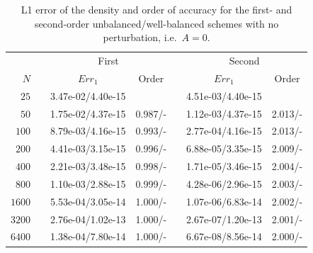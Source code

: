 \begin{table}\centering
\caption{L1 error of the density and order of accuracy for the first- and second-order unbalanced/well-balanced schemes with no perturbation, i.e.\ $A=0$.}
\label{table:OVS_A0}
\begin{tabular}{@{}rcccccc@{}}\toprule
& \phantom{a} & \multicolumn{2}{c}{First} & \phantom{ab} & \multicolumn{2}{c}{Second}\\
\cmidrule{3-4} \cmidrule{6-7}
$N$ && $Err_1$ & Order && $Err_1$ & Order\\ \midrule
$25$ && 3.47e-02/4.40e-15 &&& 4.51e-03/4.40e-15 &\\
$50$ && 1.75e-02/4.37e-15 & 0.987/- && 1.12e-03/4.37e-15 & 2.013/-\\
$100$ && 8.79e-03/4.16e-15 & 0.993/- && 2.77e-04/4.16e-15 & 2.013/-\\
$200$ && 4.41e-03/3.15e-15 & 0.996/- && 6.88e-05/3.35e-15 & 2.009/-\\
$400$ && 2.21e-03/3.48e-15 & 0.998/- && 1.71e-05/3.46e-15 & 2.004/-\\
$800$ && 1.10e-03/2.88e-15 & 0.999/- && 4.28e-06/2.96e-15 & 2.003/-\\
$1600$ && 5.53e-04/3.05e-14 & 1.000/- && 1.07e-06/6.83e-14 & 2.002/-\\
$3200$ && 2.76e-04/1.02e-13 & 1.000/- && 2.67e-07/1.20e-13 & 2.001/-\\
$6400$ && 1.38e-04/7.80e-14 & 1.000/- && 6.67e-08/8.56e-14 & 2.000/-\\
\bottomrule
\end{tabular}
\end{table}

